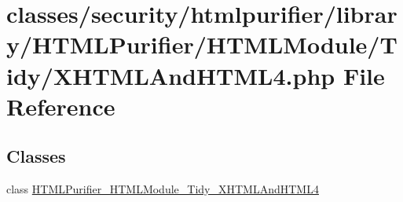 \hypertarget{XHTMLAndHTML4_8php}{\section{classes/security/htmlpurifier/library/\+H\+T\+M\+L\+Purifier/\+H\+T\+M\+L\+Module/\+Tidy/\+X\+H\+T\+M\+L\+And\+H\+T\+M\+L4.php File Reference}
\label{XHTMLAndHTML4_8php}
}
\subsection*{Classes}
\begin{DoxyCompactItemize}
\item 
class \hyperlink{classHTMLPurifier__HTMLModule__Tidy__XHTMLAndHTML4}{H\+T\+M\+L\+Purifier\+\_\+\+H\+T\+M\+L\+Module\+\_\+\+Tidy\+\_\+\+X\+H\+T\+M\+L\+And\+H\+T\+M\+L4}
\end{DoxyCompactItemize}
